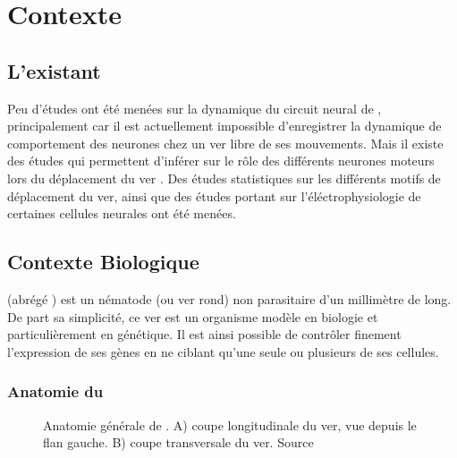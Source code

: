 \chapter{Contexte} %
\label{cha:Contexte}

\section{L'existant} %
\label{sec:L'existant}

Peu d'études ont été menées sur la dynamique du circuit neural de \celeg{},
principalement car il est actuellement impossible d'enregistrer la dynamique de
comportement des neurones chez un ver libre de ses mouvements.  Mais il existe
des études qui permettent d'inférer sur le rôle des différents neurones moteurs
lors du déplacement du ver \cite{Yanik2006,Chronis2007,Leifer2011}.  Des études
statistiques sur les différents motifs de déplacement \cite{Gray2005} du ver,
ainsi que des études portant sur l'éléctrophysiologie de certaines cellules
neurales \cite{Mellem2008a,Lockery2009} ont été menées.


\section{Contexte Biologique} %
\label{sec:Contexte Biologique}

\caeleg{} (abrégé \celeg{}) est un nématode (ou ver rond) non parasitaire d'un
millimètre de long. De part sa simplicité, ce ver est un organisme modèle en biologie
et particulièrement en génétique. Il est ainsi possible de contrôler
finement l'expression de ses gènes en ne ciblant qu'une seule ou plusieurs de
ses cellules.

\subsection{Anatomie du \celeg{}} %
\label{sub:Anatomie du caeleg}

\begin{figure}[ht]
   \begin{center}
   \end{center}
   \caption{Anatomie générale de \caeleg{}. A) coupe longitudinale du ver,
   vue depuis le flan gauche. B) coupe transversale du ver. Source
   \cite{Boyle2009}}
   \label{fig:celegans_anatomy}
\end{figure}

